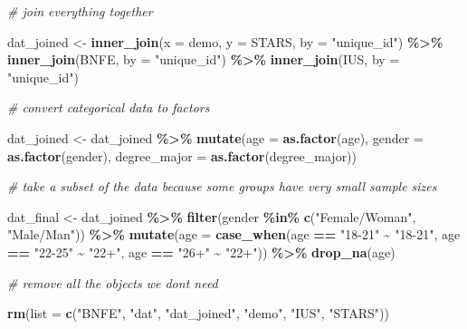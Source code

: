 \documentclass[
  oneside]{book}
\newenvironment{Shaded}{\begin{snugshade}}{\end{snugshade}}
\newcommand{\AttributeTok}[1]{\textcolor[rgb]{0.13,0.29,0.53}{#1}}
\newcommand{\CommentTok}[1]{\textcolor[rgb]{0.56,0.35,0.01}{\textit{#1}}}
\newcommand{\FunctionTok}[1]{\textcolor[rgb]{0.13,0.29,0.53}{\textbf{#1}}}
\newcommand{\NormalTok}[1]{#1}
\newcommand{\OtherTok}[1]{\textcolor[rgb]{0.56,0.35,0.01}{#1}}
\newcommand{\SpecialCharTok}[1]{\textcolor[rgb]{0.81,0.36,0.00}{\textbf{#1}}}
\newcommand{\StringTok}[1]{\textcolor[rgb]{0.31,0.60,0.02}{#1}}
\begin{document}
\begin{Shaded}
\begin{Highlighting}[]
\CommentTok{\# join everything together}

\NormalTok{dat\_joined }\OtherTok{\textless{}{-}} \FunctionTok{inner\_join}\NormalTok{(}\AttributeTok{x =}\NormalTok{ demo, }\AttributeTok{y =}\NormalTok{ STARS, }\AttributeTok{by =} \StringTok{"unique\_id"}\NormalTok{) }\SpecialCharTok{\%\textgreater{}\%}
  \FunctionTok{inner\_join}\NormalTok{(BNFE, }\AttributeTok{by =} \StringTok{"unique\_id"}\NormalTok{) }\SpecialCharTok{\%\textgreater{}\%}
  \FunctionTok{inner\_join}\NormalTok{(IUS, }\AttributeTok{by =} \StringTok{"unique\_id"}\NormalTok{)}

\CommentTok{\# convert categorical data to factors}

\NormalTok{dat\_joined }\OtherTok{\textless{}{-}}\NormalTok{ dat\_joined }\SpecialCharTok{\%\textgreater{}\%}
  \FunctionTok{mutate}\NormalTok{(}\AttributeTok{age =} \FunctionTok{as.factor}\NormalTok{(age),}
         \AttributeTok{gender =} \FunctionTok{as.factor}\NormalTok{(gender),}
         \AttributeTok{degree\_major =} \FunctionTok{as.factor}\NormalTok{(degree\_major))}

\CommentTok{\# take a subset of the data because some groups have very small sample sizes}

\NormalTok{dat\_final }\OtherTok{\textless{}{-}}\NormalTok{ dat\_joined }\SpecialCharTok{\%\textgreater{}\%}
  \FunctionTok{filter}\NormalTok{(gender }\SpecialCharTok{\%in\%} \FunctionTok{c}\NormalTok{(}\StringTok{"Female/Woman"}\NormalTok{, }\StringTok{"Male/Man"}\NormalTok{)) }\SpecialCharTok{\%\textgreater{}\%}
  \FunctionTok{mutate}\NormalTok{(}\AttributeTok{age =} \FunctionTok{case\_when}\NormalTok{(age }\SpecialCharTok{==} \StringTok{"18{-}21"} \SpecialCharTok{\textasciitilde{}} \StringTok{"18{-}21"}\NormalTok{,}
\NormalTok{                         age }\SpecialCharTok{==} \StringTok{"22{-}25"} \SpecialCharTok{\textasciitilde{}} \StringTok{"22+"}\NormalTok{,}
\NormalTok{                         age }\SpecialCharTok{==} \StringTok{"26+"} \SpecialCharTok{\textasciitilde{}} \StringTok{"22+"}\NormalTok{)) }\SpecialCharTok{\%\textgreater{}\%}
  \FunctionTok{drop\_na}\NormalTok{(age)}

\CommentTok{\# remove all the objects we don\textquotesingle{}t need }

\FunctionTok{rm}\NormalTok{(}\AttributeTok{list =} \FunctionTok{c}\NormalTok{(}\StringTok{"BNFE"}\NormalTok{, }\StringTok{"dat"}\NormalTok{, }\StringTok{"dat\_joined"}\NormalTok{, }\StringTok{"demo"}\NormalTok{, }\StringTok{"IUS"}\NormalTok{, }\StringTok{"STARS"}\NormalTok{))}
\end{Highlighting}
\end{Shaded}
\end{document}
